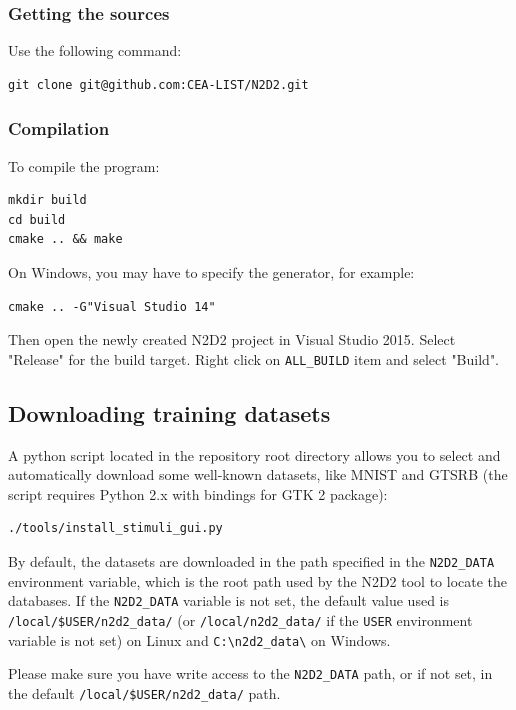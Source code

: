 \documentclass[a4paper,11pt,oneside]{article}
\begin{document}
\subsubsection{Getting the sources}

\noindent Use the following command:
\begin{lstlisting}
git clone git@github.com:CEA-LIST/N2D2.git
\end{lstlisting}

\subsubsection{Compilation}

\noindent To compile the program:
\begin{lstlisting}
mkdir build
cd build
cmake .. && make
\end{lstlisting}

On Windows, you may have to specify the generator, for example:
\begin{lstlisting}
cmake .. -G"Visual Studio 14"
\end{lstlisting}

Then open the newly created N2D2 project in Visual Studio 2015. Select
"Release" for the build target. Right click on \lstinline!ALL_BUILD! item and
select "Build".


\subsection{Downloading training datasets}

A python script located in the repository root directory allows you to select and
 automatically download some well-known datasets, like MNIST and GTSRB
 (the script requires Python 2.x with bindings for GTK 2 package):
\begin{lstlisting}
./tools/install_stimuli_gui.py
\end{lstlisting}

By default, the datasets are downloaded in the path specified in the
 \lstinline!N2D2_DATA! environment variable, which is the root path used by the
 N2D2 tool to locate the databases. If the \lstinline!N2D2_DATA! variable is
  not set, the default value used is {\tt{}/local/\$USER/n2d2\_data/}
  (or {\tt{}/local/n2d2\_data/} if the \lstinline!USER! environment variable
   is not set) on Linux and {\tt{}C:\textbackslash{}n2d2\_data\textbackslash{}}
    on Windows.

Please make sure you have write access to the \lstinline!N2D2_DATA! path, or if
not set, in the default {\tt{}/local/\$USER/n2d2\_data/} path.
\end{document}
